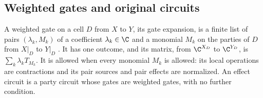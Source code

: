 \subsection{Weighted gates and original circuits}
\label{sec:party_syntax_original}

\begin{definition}
    \label{def:party_weighted_gate}
    \leanok
    A weighted gate on a cell $D$ from $X$ to $Y$, its gate expansion, is a finite list
    of pairs $(\lambda_k,M_k)$ of a coefficient $\lambda_k\in\C$ and a monomial $M_k$ on
    the parties of $D$ from $X|_D$ to $Y|_D$
    \cite[Section~5.1]{OpenAI2026PolynomialPEPS}. It has one outcome, and its matrix,
    from $\C^{X_D}$ to $\C^{Y_D}$, is $\sum_k\lambda_kT_{M_k}$. It is allowed when every
    monomial $M_k$ is allowed: its local operations are contractions and its pair
    sources and pair effects are normalized. An effect circuit is a party circuit whose
    gates are weighted gates, with no further condition.
\end{definition}

